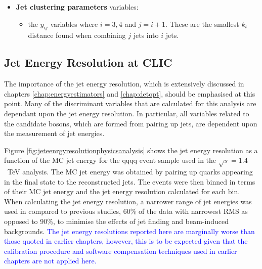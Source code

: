 \begin{itemize}
\item \textbf{Jet clustering parameters} variables:
\begin{itemize}
\item the $y_{ij}$ variables where $i = 3,4$ and $j=i+1$.  These are the smallest $k_{t}$ distance found when combining $j$ jets into $i$ jets.  
\end{itemize}
\end{itemize}


\subsection{Jet Energy Resolution at CLIC} 
\label{sec:jetenergyresolution}
The importance of the jet energy resolution, which is extensively discussed in chapters \ref{chap:energyestimators} and \ref{chap:detopt}, should be emphasised at this point.  Many of the discriminant variables that are calculated for this analysis are dependant upon the jet energy resolution.  In particular, all variables related to the candidate bosons, which are formed from pairing up jets, are dependent upon the measurement of jet energies.  

Figure \ref{fig:jeteenrgyresolutionphysicsanalysis} shows the jet energy resolution as a function of the MC jet energy for the {\nu}{\nu}qqqq event sample used in the $\sqrt{s}=1.4$~TeV analysis.  The MC jet energy was obtained by pairing up quarks appearing in the final state to the reconstructed jets.  The events were then binned in terms of their MC jet energy and the jet energy resolution calculated for each bin.  When calculating the jet energy resolution, a narrower range of jet energies was used in compared to previous studies, 60\% of the data with narrowest RMS as opposed to 90\%, to minimise the effects of jet finding and beam-induced backgrounds.  \textcolor{blue}{The jet energy resolutions reported here are marginally worse than those quoted in earlier chapters, however, this is to be expected given that the calibration procedure and software compensation techniques used in earlier chapters are not applied here.}

